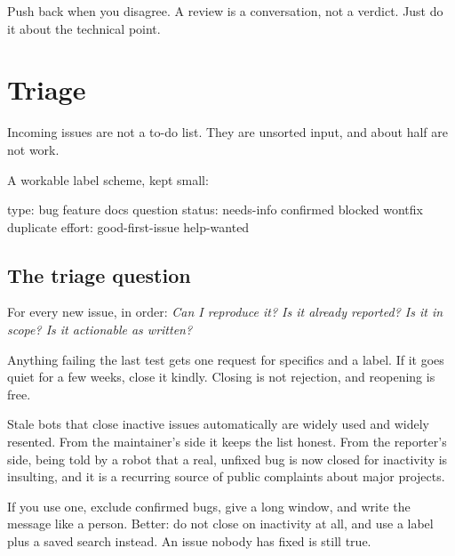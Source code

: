 \documentclass[11pt]{article}
\begin{document}
Push back when you disagree. A review is a conversation, not a verdict. Just do it
about the technical point.

\section{Triage}

Incoming issues are not a to-do list. They are unsorted input, and about half are
not work.

A workable label scheme, kept small:

\begin{terminal}
type:    bug  feature  docs  question
status:  needs-info  confirmed  blocked  wontfix  duplicate
effort:  good-first-issue  help-wanted
\end{terminal}


\subsection{The triage question}

For every new issue, in order: \emph{Can I reproduce it? Is it already reported? Is
it in scope? Is it actionable as written?}

Anything failing the last test gets one request for specifics and a
 label. If it goes quiet for a few weeks, close it kindly.
Closing is not rejection, and reopening is free.

\begin{trap}
Stale bots that close inactive issues automatically are widely used and widely
resented. From the maintainer's side it keeps the list honest. From the reporter's
side, being told by a robot that a real, unfixed bug is now closed for inactivity is
insulting, and it is a recurring source of public complaints about major projects.

If you use one, exclude confirmed bugs, give a long window, and write the message
like a person. Better: do not close on inactivity at all, and use a label plus a
saved search instead. An issue nobody has fixed is still true.
\end{trap}
\end{document}
